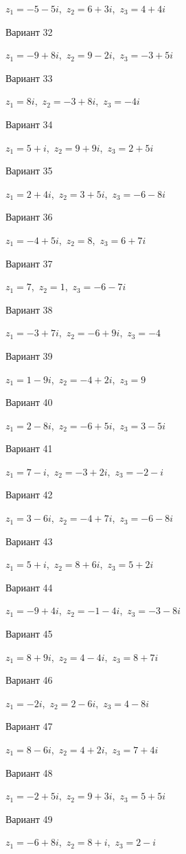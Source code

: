 \documentclass[11pt]{report}
\begin{document}
$z_1 = -5 - 5 i$,\ $z_2 = 6 + 3 i$,\ $z_3 = 4 + 4 i$

Вариант 32

$z_1 = -9 + 8 i$,\ $z_2 = 9 - 2 i$,\ $z_3 = -3 + 5 i$

Вариант 33

$z_1 = 8 i$,\ $z_2 = -3 + 8 i$,\ $z_3 = - 4 i$

Вариант 34

$z_1 = 5 + i$,\ $z_2 = 9 + 9 i$,\ $z_3 = 2 + 5 i$

Вариант 35

$z_1 = 2 + 4 i$,\ $z_2 = 3 + 5 i$,\ $z_3 = -6 - 8 i$

Вариант 36

$z_1 = -4 + 5 i$,\ $z_2 = 8$,\ $z_3 = 6 + 7 i$

Вариант 37

$z_1 = 7$,\ $z_2 = 1$,\ $z_3 = -6 - 7 i$

Вариант 38

$z_1 = -3 + 7 i$,\ $z_2 = -6 + 9 i$,\ $z_3 = -4$

Вариант 39

$z_1 = 1 - 9 i$,\ $z_2 = -4 + 2 i$,\ $z_3 = 9$

Вариант 40

$z_1 = 2 - 8 i$,\ $z_2 = -6 + 5 i$,\ $z_3 = 3 - 5 i$

Вариант 41

$z_1 = 7 - i$,\ $z_2 = -3 + 2 i$,\ $z_3 = -2 - i$

Вариант 42

$z_1 = 3 - 6 i$,\ $z_2 = -4 + 7 i$,\ $z_3 = -6 - 8 i$

Вариант 43

$z_1 = 5 + i$,\ $z_2 = 8 + 6 i$,\ $z_3 = 5 + 2 i$

Вариант 44

$z_1 = -9 + 4 i$,\ $z_2 = -1 - 4 i$,\ $z_3 = -3 - 8 i$

Вариант 45

$z_1 = 8 + 9 i$,\ $z_2 = 4 - 4 i$,\ $z_3 = 8 + 7 i$

Вариант 46

$z_1 = - 2 i$,\ $z_2 = 2 - 6 i$,\ $z_3 = 4 - 8 i$

Вариант 47

$z_1 = 8 - 6 i$,\ $z_2 = 4 + 2 i$,\ $z_3 = 7 + 4 i$

Вариант 48

$z_1 = -2 + 5 i$,\ $z_2 = 9 + 3 i$,\ $z_3 = 5 + 5 i$

Вариант 49

$z_1 = -6 + 8 i$,\ $z_2 = 8 + i$,\ $z_3 = 2 - i$
\end{document}
